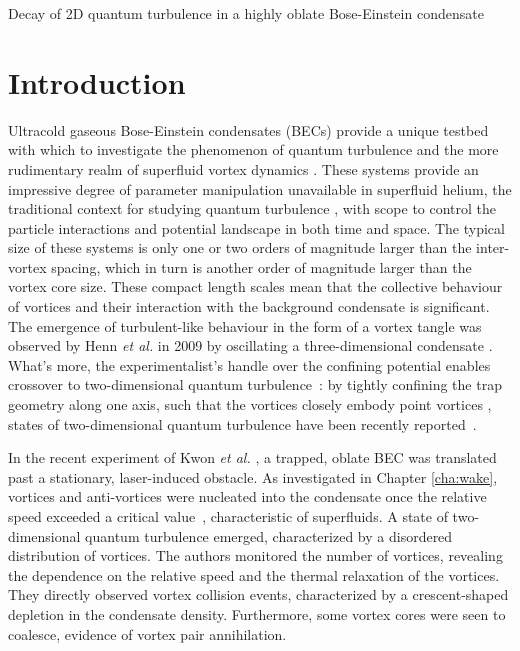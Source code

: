 \begin{chapter}{\label{cha:shin}Decay of 2D quantum turbulence in a highly oblate Bose-Einstein condensate}
\newcommand{\gws}[1]{\textcolor{blue}{#1}}
\newcommand{\ngp}[1]{#1}%
\newcommand{\etal}{{\it et al.}~}
\newcommand{\etalcc}{{\it et al.}}
\newcommand{\boldell}{{\mbox{\boldmath $\ell$}}}
\newcommand{\intr}{\int d \mathbf{r}}
\newcommand{\bfrt}{({\bf{r}},t)}
\newcommand{\fprt}{f({\mathbf{p}}, {\mathbf{r}},t)}

\section{Introduction}
Ultracold gaseous Bose-Einstein condensates (BECs) provide a unique testbed with which to investigate the phenomenon of quantum turbulence and the more rudimentary realm of superfluid vortex dynamics \citep{white_anderson_14,barenghi_skrbek_14}.  These systems provide an impressive degree of parameter manipulation unavailable in superfluid helium, the traditional context for studying quantum turbulence \citep{barenghi_donnelly_01}, with scope to control the particle interactions and potential landscape in both time and space.  The typical size of these systems is only one or two orders of magnitude larger than the inter-vortex spacing, which in turn is another order of magnitude larger than the vortex core size.  These compact length scales mean that the collective behaviour of vortices and their interaction with the background condensate is significant.  The emergence of turbulent-like behaviour in the form of a vortex tangle was observed by Henn {\it et al.} in 2009 by oscillating a three-dimensional condensate \cite{Henn}.  What's more, the experimentalist's handle over the confining potential enables crossover to two-dimensional quantum turbulence~\cite{parker2005}: by tightly confining the trap geometry along one axis, such that the vortices closely embody point vortices \cite{middelkamp}, states of two-dimensional quantum turbulence have been recently reported~\citep{neely_bradley_13,kwon_moon_14}.

In the recent experiment of Kwon {\it et al.} \citep{kwon_moon_14}, a trapped, oblate BEC was translated past a stationary, laser-induced obstacle.  As investigated in Chapter \ref{cha:wake}, vortices and anti-vortices were nucleated into the condensate once the relative speed exceeded a critical value~\cite{frisch92}, characteristic of superfluids. A state of two-dimensional quantum turbulence emerged, characterized by a disordered distribution of vortices.  The authors monitored the number of vortices, revealing the dependence on the relative speed and the thermal relaxation of the vortices.  They directly observed vortex collision events, characterized by a crescent-shaped depletion in the condensate density. Furthermore, some vortex cores were seen to coalesce, evidence of vortex pair annihilation.


\end{chapter}
